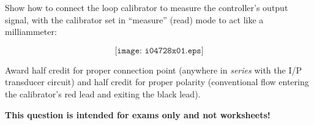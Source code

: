 

Show how to connect the loop calibrator to measure the controller's output signal, with the calibrator set in ``measure'' (read) mode to act like a milliammeter:

$$\texttt{[image: i04728x01.eps]}$$







Award half credit for proper connection point (anywhere in {\it series} with the I/P transducer circuit) and half credit for proper polarity (conventional flow entering the calibrator's red lead and exiting the black lead).







{\bf This question is intended for exams only and not worksheets!}



